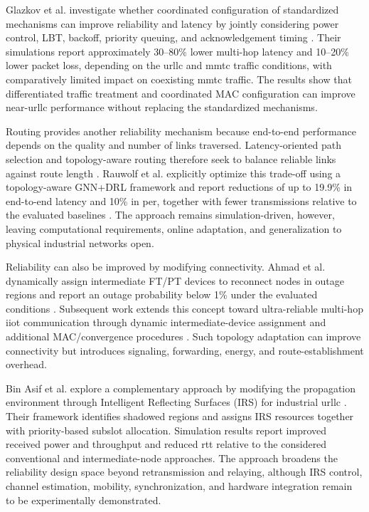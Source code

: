 Glazkov et al. investigate whether coordinated configuration of standardized mechanisms can improve reliability and latency by jointly considering power control, LBT, backoff, priority queuing, and acknowledgement timing \cite{glazkovImprovingNearURLLCServices2025}. Their simulations report approximately 30--80\% lower multi-hop latency and 10--20\% lower packet loss, depending on the \gls{urllc} and \gls{mmtc} traffic conditions, with comparatively limited impact on coexisting \gls{mmtc} traffic. The results show that differentiated traffic treatment and coordinated MAC configuration can improve near-\gls{urllc} performance without replacing the standardized mechanisms.

Routing provides another reliability mechanism because end-to-end performance depends on the quality and number of links traversed. Latency-oriented path selection and topology-aware routing therefore seek to balance reliable links against route length \cite{asifURLLCBasedMultiHopCommunication2025, rauwolfTopologyAwareDeepReinforcement2026a}. Rauwolf et al. explicitly optimize this trade-off using a topology-aware GNN+DRL framework and report reductions of up to 19.9\% in end-to-end latency and 10\% in \gls{per}, together with fewer transmissions relative to the evaluated baselines \cite{rauwolfTopologyAwareDeepReinforcement2026a}. The approach remains simulation-driven, however, leaving computational requirements, online adaptation, and generalization to physical industrial networks open.

Reliability can also be improved by modifying connectivity. Ahmad et al. dynamically assign intermediate FT/PT devices to reconnect nodes in outage regions and report an outage probability below 1\% under the evaluated conditions \cite{ahmadMACProtocolReducing2024}. Subsequent work extends this concept toward ultra-reliable multi-hop \gls{iiot} communication through dynamic intermediate-device assignment and additional MAC/convergence procedures \cite{ahmadMACLayerProtocolUltraReliable2025}. Such topology adaptation can improve connectivity but introduces signaling, forwarding, energy, and route-establishment overhead.

Bin Asif et al. explore a complementary approach by modifying the propagation environment through Intelligent Reflecting Surfaces (IRS) for industrial \gls{urllc} \cite{binasifIRSAssistedDECT2020NR2025}. Their framework identifies shadowed regions and assigns IRS resources together with priority-based subslot allocation. Simulation results report improved received power and throughput and reduced \gls{rtt} relative to the considered conventional and intermediate-node approaches. The approach broadens the reliability design space beyond retransmission and relaying, although IRS control, channel estimation, mobility, synchronization, and hardware integration remain to be experimentally demonstrated.

